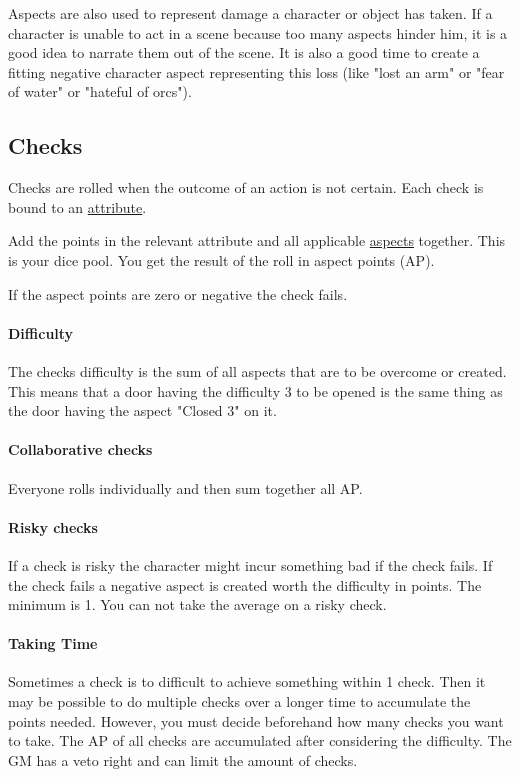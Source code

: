 \documentclass[11pt]{article}
\begin{document}
{Aspects are also used to represent damage a character or object has taken. If a character is unable to act in a scene because too many aspects hinder him, it is a good idea to narrate them out of the scene. It is also a good time to create a fitting negative character aspect representing this loss (like "lost an arm" or "fear of water" or "hateful of orcs").

\subsection{Checks}
\label{sec:org616017e}
Checks are rolled when the outcome of an action is not certain. Each check is bound to an \hyperref[sec:org3864d98]{attribute}.

Add the points in the relevant attribute and all applicable \hyperref[sec:org954617a]{aspects} together. This is your dice pool. You get the result of the roll in aspect points (AP).

If the aspect points are zero or negative the check fails.

\paragraph*{Difficulty}
\label{sec:org3bfec54}
The checks difficulty is the sum of all aspects that are to be overcome or created. This means that a door having the difficulty 3 to be opened is the same thing as the door having the aspect "Closed 3" on it. 

\paragraph*{Collaborative checks}
\label{sec:orge035bc7}
Everyone rolls individually and then sum together all AP.

\paragraph*{Risky checks}
\label{sec:orgf0ecf1c}
If a check is risky the character might incur something bad if the check fails. If the check fails a negative aspect is created worth the difficulty in points. The minimum is 1. You can not take the average on a risky check.

\paragraph*{Taking Time}
\label{sec:org947d24e}
Sometimes a check is to difficult to achieve something within 1 check. Then it may be possible to do multiple checks over a longer time to accumulate the points needed. However, you must decide beforehand how many checks you want to take. The AP of all checks are accumulated after considering the difficulty. The GM has a veto right and can limit the amount of checks.

}
\end{document}
